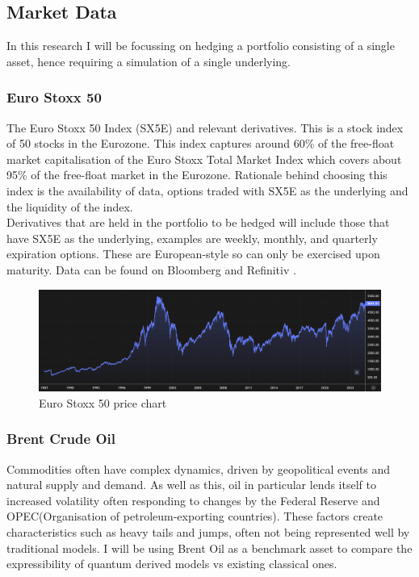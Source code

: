 \documentclass[12pt]{article}
\numberwithin{equation}{section}
\begin{document}
\subsection{Market Data}
In this research I will be focussing on hedging a portfolio consisting of a single 
asset, hence requiring a simulation of a single underlying. 
\subsubsection{Euro Stoxx 50}
The Euro Stoxx 50 Index (SX5E) and relevant derivatives. This is a stock index of 50 stocks in the Eurozone. 
This index captures around 60\% of the free-float market capitalisation of the 
Euro Stoxx Total Market Index which covers about 95\% of the free-float market 
in the Eurozone\autocite{a2021_euro}. Rationale behind choosing this index is the availability of data,
options traded with SX5E as the underlying and the liquidity of the index.
\\
Derivatives that are held in the portfolio to be hedged will include those that 
have SX5E as the underlying, examples are weekly, monthly, and quarterly
expiration options. These are European-style so can only be exercised upon 
maturity. Data can be found on Bloomberg\autocite{bloomberg_2023_bloomberg} and Refinitiv
\autocite{lseg}.
\begin{figure}[h]
    \centering
    \includegraphics[scale=0.35]{sx5e.png}
    \caption{Euro Stoxx 50 price chart}
\end{figure}

\subsubsection{Brent Crude Oil}
Commodities often have complex dynamics, driven by geopolitical events and natural 
supply and demand. As well as this, oil in particular lends itself to increased
volatility often responding to changes by the Federal Reserve and OPEC(Organisation 
of petroleum-exporting countries). These factors create characteristics such as 
heavy tails and jumps, often not being represented well by traditional models. 
I will be using Brent Oil as a benchmark asset to compare the expressibility of 
quantum derived models vs existing classical ones. 
\end{document}

